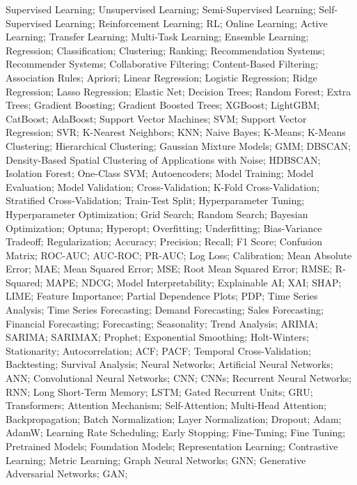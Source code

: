 {  Supervised Learning; Unsupervised Learning; Semi-Supervised Learning;
  Self-Supervised Learning; Reinforcement Learning; RL; Online Learning;
  Active Learning; Transfer Learning; Multi-Task Learning; Ensemble Learning;
  Regression; Classification; Clustering; Ranking; Recommendation Systems;
  Recommender Systems; Collaborative Filtering; Content-Based Filtering;
  Association Rules; Apriori; Linear Regression; Logistic Regression;
  Ridge Regression; Lasso Regression; Elastic Net; Decision Trees;
  Random Forest; Extra Trees; Gradient Boosting; Gradient Boosted Trees;
  XGBoost; LightGBM; CatBoost; AdaBoost; Support Vector Machines; SVM;
  Support Vector Regression; SVR; K-Nearest Neighbors; KNN; Naive Bayes;
  K-Means; K-Means Clustering; Hierarchical Clustering; Gaussian Mixture Models;
  GMM; DBSCAN; Density-Based Spatial Clustering of Applications with Noise;
  HDBSCAN; Isolation Forest; One-Class SVM; Autoencoders;
  Model Training; Model Evaluation; Model Validation; Cross-Validation;
  K-Fold Cross-Validation; Stratified Cross-Validation; Train-Test Split;
  Hyperparameter Tuning; Hyperparameter Optimization; Grid Search;
  Random Search; Bayesian Optimization; Optuna; Hyperopt;
  Overfitting; Underfitting; Bias-Variance Tradeoff; Regularization;
  Accuracy; Precision; Recall; F1 Score; Confusion Matrix;
  ROC-AUC; AUC-ROC; PR-AUC; Log Loss; Calibration;
  Mean Absolute Error; MAE; Mean Squared Error; MSE;
  Root Mean Squared Error; RMSE; R-Squared; MAPE; NDCG;
  Model Interpretability; Explainable AI; XAI; SHAP; LIME;
  Feature Importance; Partial Dependence Plots; PDP;
  Time Series Analysis; Time Series Forecasting; Demand Forecasting;
  Sales Forecasting; Financial Forecasting; Forecasting; Seasonality;
  Trend Analysis; ARIMA; SARIMA; SARIMAX; Prophet; Exponential Smoothing;
  Holt-Winters; Stationarity; Autocorrelation; ACF; PACF;
  Temporal Cross-Validation; Backtesting; Survival Analysis;
  Neural Networks; Artificial Neural Networks; ANN;
  Convolutional Neural Networks; CNN; CNNs; Recurrent Neural Networks; RNN;
  Long Short-Term Memory; LSTM; Gated Recurrent Units; GRU;
  Transformers; Attention Mechanism; Self-Attention; Multi-Head Attention;
  Backpropagation; Batch Normalization; Layer Normalization; Dropout;
  Adam; AdamW; Learning Rate Scheduling; Early Stopping;
  Fine-Tuning; Fine Tuning; Pretrained Models; Foundation Models;
  Representation Learning; Contrastive Learning; Metric Learning;
  Graph Neural Networks; GNN; Generative Adversarial Networks; GAN;
}

